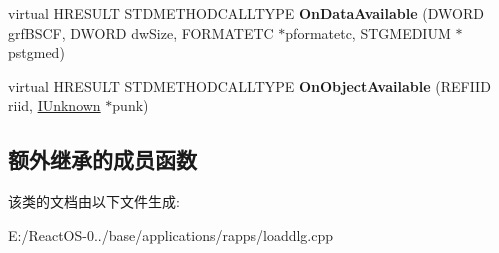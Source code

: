 \begin{DoxyCompactItemize}
\item 
\mbox{\label{class_c_download_dialog_a3f3a3ddf0f12e227aff4e40cb70ea0b3}} 
virtual H\+R\+E\+S\+U\+LT S\+T\+D\+M\+E\+T\+H\+O\+D\+C\+A\+L\+L\+T\+Y\+PE {\bfseries On\+Data\+Available} (D\+W\+O\+RD grf\+B\+S\+CF, D\+W\+O\+RD dw\+Size, F\+O\+R\+M\+A\+T\+E\+TC $\ast$pformatetc, S\+T\+G\+M\+E\+D\+I\+UM $\ast$pstgmed)
\item 
\mbox{\label{class_c_download_dialog_ad0dc0363aa43f67bb5a7ea8efb41d1f1}} 
virtual H\+R\+E\+S\+U\+LT S\+T\+D\+M\+E\+T\+H\+O\+D\+C\+A\+L\+L\+T\+Y\+PE {\bfseries On\+Object\+Available} (R\+E\+F\+I\+ID riid, \hyperlink{interface_i_unknown}{I\+Unknown} $\ast$punk)
\end{DoxyCompactItemize}
\subsection*{额外继承的成员函数}


该类的文档由以下文件生成\+:\begin{DoxyCompactItemize}
\item 
E\+:/\+React\+O\+S-\/0../base/applications/rapps/loaddlg.\+cpp\end{DoxyCompactItemize}
